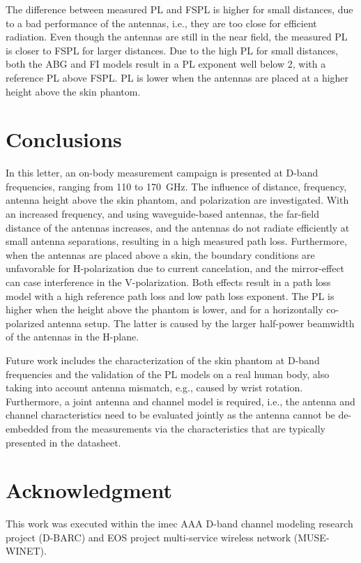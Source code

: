 \documentclass[preprint]{rsl}
\begin{document}
The difference between measured PL and FSPL is higher for small distances, due to a bad performance of the antennas, i.e., they are too close for efficient radiation. 
Even though the antennas are still in the near field, the measured PL is closer to FSPL for larger distances. 
Due to the high PL for small distances, both the ABG and FI models result in a PL exponent well below 2, with a reference PL above FSPL. 
PL is lower when the antennas are placed at a higher height above the skin phantom. 

\section{Conclusions\label{sect:conclusion}}

In this letter, an on-body measurement campaign is presented at D-band frequencies, ranging from 110 to 170~GHz. 
The influence of distance, frequency, antenna height above the skin phantom, and polarization are investigated.
With an increased frequency, and using waveguide-based antennas, the far-field distance of the antennas increases, and the antennas do not radiate efficiently at small antenna separations, resulting in a high measured path loss. 
Furthermore, when the antennas are placed above a skin, the boundary conditions are unfavorable for H-polarization due to current cancelation, and the mirror-effect can case interference in the V-polarization.
Both effects result in a path loss model with a high reference path loss and low path loss exponent.
The PL is higher when the height above the phantom is lower, and for a horizontally co-polarized antenna setup. 
The latter is caused by the larger half-power beamwidth of the antennas in the H-plane.

Future work includes the characterization of the skin phantom at D-band frequencies and the validation of the PL models on a real human body, also taking into account antenna mismatch, e.g., caused by wrist rotation.
Furthermore, a joint antenna and channel model is required, i.e., the antenna and channel characteristics need to be evaluated jointly as the antenna cannot be de-embedded from the measurements via the characteristics that are typically presented in the datasheet.

\section{Acknowledgment}

This work was executed within the imec AAA D-band channel modeling research project (D-BARC) and EOS project multi-service wireless network (MUSE-WINET). 
\end{document}
